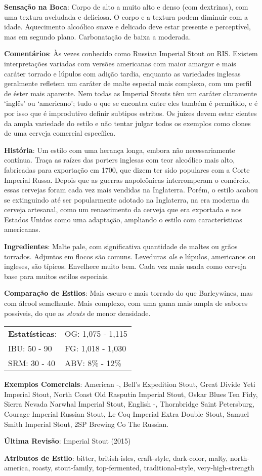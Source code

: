 \textbf{Sensação na Boca}: Corpo de alto a muito alto e denso (com dextrinas), com uma textura aveludada e deliciosa. O corpo e a textura podem diminuir com a idade. Aquecimento alcoólico suave e delicado deve estar presente e perceptível, mas em segundo plano. Carbonatação de baixa a moderada.

\textbf{Comentários}: Às vezes conhecido como Russian Imperial Stout ou RIS. Existem interpretações variadas com versões americanas com maior amargor e mais caráter torrado e lúpulos com adição tardia, enquanto as variedades inglesas geralmente refletem um caráter de malte especial mais complexo, com um perfil de éster mais aparente. Nem todas as Imperial Stouts têm um caráter claramente ‘inglês’ ou ‘americano’; tudo o que se encontra entre eles também é permitido, e é por isso que é improdutivo definir subtipos estritos. Os juízes devem estar cientes da ampla variedade do estilo e não tentar julgar todos os exemplos como clones de uma cerveja comercial específica.

\textbf{História}: Um estilo com uma herança longa, embora não necessariamente contínua. Traça as raízes das porters inglesas com teor alcoólico mais alto, fabricadas para exportação em 1700, que dizem ter sido populares com a Corte Imperial Russa. Depois que as guerras napoleônicas interromperam o comércio, essas cervejas foram cada vez mais vendidas na Inglaterra. Porém, o estilo acabou se extinguindo até ser popularmente adotado na Inglaterra, na era moderna da cerveja artesanal, como um renascimento da cerveja que era exportada e nos Estados Unidos como uma adaptação, ampliando o estilo com características americanas.

\textbf{Ingredientes}: Malte pale, com significativa quantidade de maltes ou grãos torrados. Adjuntos em flocos são comuns. Leveduras \textit{ale} e lúpulos, americanos ou ingleses, são típicos. Envelhece muito bem. Cada vez mais usada como cerveja base para muitos estilos especiais.

\textbf{Comparação de Estilos}: Mais escuro e mais torrado do que Barleywines, mas com álcool semelhante. Mais complexo, com uma gama mais ampla de sabores possíveis, do que as \textit{stouts} de menor densidade.

\begin{tabular}{@{}p{35mm}p{35mm}@{}}
  \textbf{Estatísticas}: & OG: 1,075 - 1,115 \\
  IBU: 50 - 90  & FG: 1,018 - 1,030 \\
  SRM: 30 - 40  & ABV: 8\% - 12\%
\end{tabular}

\textbf{Exemplos Comerciais}: American -, Bell's Expedition Stout, Great Divide Yeti Imperial Stout, North Coast Old Rasputin Imperial Stout, Oskar Blues Ten Fidy, Sierra Nevada Narwhal Imperial Stout, English -, Thornbridge Saint Petersburg, Courage Imperial Russian Stout, Le Coq Imperial Extra Double Stout, Samuel Smith Imperial Stout, 2SP Brewing Co The Russian.

\textbf{Última Revisão}: Imperial Stout (2015)

\textbf{Atributos de Estilo}: bitter, british-isles, craft-style, dark-color, malty, north-america, roasty, stout-family, top-fermented, traditional-style, very-high-strength
